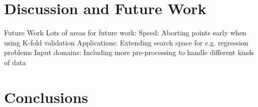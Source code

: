 \documentclass[wcp]{jmlr}
\begin{document}
\section{Discussion and Future Work}
Future Work
Lots of areas for future work:
Speed: Aborting points early when using K-fold validation
Applications: Extending search space for e.g. regression problems
Input domains: Including more pre-processing to handle different kinds of data


\section{Conclusions}




\end{document}
